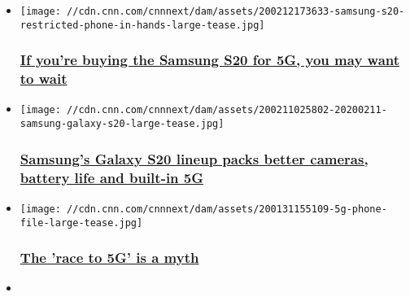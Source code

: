 \begin{itemize}
\item
  \href{/2020/02/13/tech/samsung-s20-5g-connectivity/index.html}{}

  \texttt{[image: //cdn.cnn.com/cnnnext/dam/assets/200212173633-samsung-s20-restricted-phone-in-hands-large-tease.jpg]}

  \hypertarget{if-youre-buying-the-samsung-s20-for-5g-you-may-want-to-wait}{%
  \subsubsection{\texorpdfstring{\href{/2020/02/13/tech/samsung-s20-5g-connectivity/index.html}{If
  you're buying the Samsung S20 for 5G, you may want to
  wait}}{If you're buying the Samsung S20 for 5G, you may want to wait}}\label{if-youre-buying-the-samsung-s20-for-5g-you-may-want-to-wait}}
\item
  \href{/2020/02/11/tech/samsung-galaxy-s20-release/index.html}{}

  \texttt{[image: //cdn.cnn.com/cnnnext/dam/assets/200211025802-20200211-samsung-galaxy-s20-large-tease.jpg]}

  \hypertarget{samsungs-galaxy-s20-lineup-packs-better-cameras-battery-life-and-built-in-5g}{%
  \subsubsection{\texorpdfstring{\href{/2020/02/11/tech/samsung-galaxy-s20-release/index.html}{Samsung's
  Galaxy S20 lineup packs better cameras, battery life and built-in
  5G}}{Samsung's Galaxy S20 lineup packs better cameras, battery life and built-in 5G}}\label{samsungs-galaxy-s20-lineup-packs-better-cameras-battery-life-and-built-in-5g}}
\item
  \href{/2020/02/03/perspectives/5g-disruption/index.html}{}

  \texttt{[image: //cdn.cnn.com/cnnnext/dam/assets/200131155109-5g-phone-file-large-tease.jpg]}

  \hypertarget{the-race-to-5g-is-a-myth}{%
  \subsubsection{\texorpdfstring{\href{/2020/02/03/perspectives/5g-disruption/index.html}{The
  'race to 5G' is a
  myth}}{The 'race to 5G' is a myth}}\label{the-race-to-5g-is-a-myth}}
\item
  \href{/2020/01/22/tech/octi-social-platform-launch/index.html}{}


\end{itemize}
